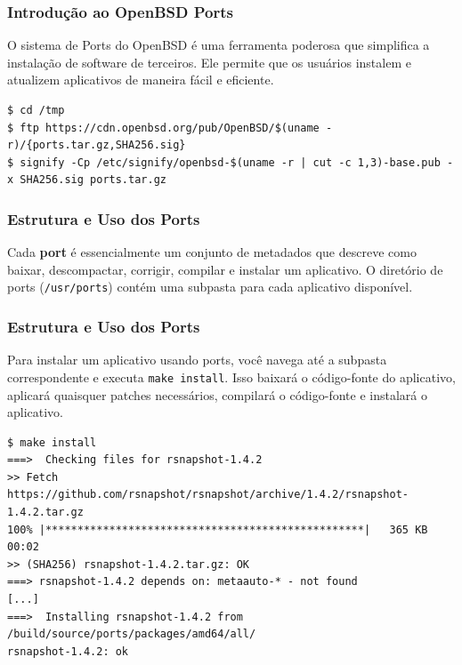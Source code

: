 \documentclass[9pt,xcolor=table]{beamer}
\begin{document}
\begin{frame}[fragile]
\frametitle{Introdução ao OpenBSD Ports}
\justifying
O sistema de Ports do OpenBSD é uma ferramenta poderosa que simplifica a instalação de software de terceiros. Ele permite que os usuários instalem e atualizem aplicativos de maneira fácil e eficiente.
\vspace{0.5cm}
\begin{lstlisting}
$ cd /tmp
$ ftp https://cdn.openbsd.org/pub/OpenBSD/$(uname -r)/{ports.tar.gz,SHA256.sig}
$ signify -Cp /etc/signify/openbsd-$(uname -r | cut -c 1,3)-base.pub -x SHA256.sig ports.tar.gz
\end{lstlisting}
\end{frame}
\begin{frame}[fragile]
\frametitle{Estrutura e Uso dos Ports}
\justifying
Cada \textbf{port} é essencialmente um conjunto de metadados que descreve como baixar, descompactar, corrigir, compilar e instalar um aplicativo. O diretório de ports (\verb|/usr/ports|) contém uma subpasta para cada aplicativo disponível.
\vspace{0.5cm}
\end{frame}
\begin{frame}[fragile]
\frametitle{Estrutura e Uso dos Ports}
\justifying
Para instalar um aplicativo usando ports, você navega até a subpasta correspondente e executa \verb|make install|. Isso baixará o código-fonte do aplicativo, aplicará quaisquer patches necessários, compilará o código-fonte e instalará o aplicativo.
\vspace{0.5cm}
\begin{lstlisting}
$ make install
===>  Checking files for rsnapshot-1.4.2
>> Fetch https://github.com/rsnapshot/rsnapshot/archive/1.4.2/rsnapshot-1.4.2.tar.gz
100% |**************************************************|   365 KB    00:02
>> (SHA256) rsnapshot-1.4.2.tar.gz: OK
===> rsnapshot-1.4.2 depends on: metaauto-* - not found
[...]
===>  Installing rsnapshot-1.4.2 from /build/source/ports/packages/amd64/all/
rsnapshot-1.4.2: ok
\end{lstlisting}
\end{frame}
\end{document}
